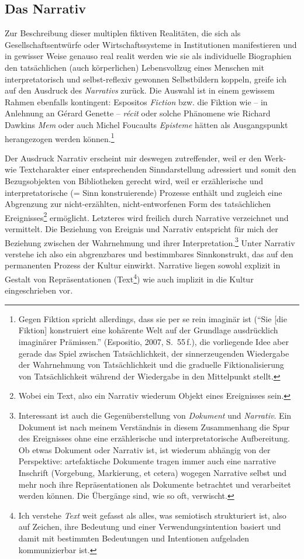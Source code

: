 \documentclass[output=paper]{langscibook}
\begin{document}
\hypertarget{das-narrativ}{%
\subsection*{Das Narrativ}\label{das-narrativ}}

Zur Beschreibung dieser multiplen fiktiven Realitäten, die sich als
Gesellschaftsentwürfe oder Wirtschaftssysteme in Institutionen
manifestieren und in gewisser Weise genauso real realit werden wie sie
als individuelle Biographien den tatsächlichen (auch körperlichen)
Lebensvollzug eines Menschen mit interpretatorisch und selbst-reflexiv
gewonnen Selbstbildern koppeln, greife ich auf den Ausdruck des
\emph{Narrativs} zurück. Die Auswahl ist in einem gewissem Rahmen
ebenfalls kontingent: Espositos \emph{Fiction} bzw. die Fiktion wie --
in Anlehnung an Gérard Genette -- \emph{récit} oder solche Phänomene wie
Richard Dawkins \emph{Mem} oder auch Michel Foucaults \emph{Episteme}
hätten als Ausgangspunkt herangezogen werden können.\footnote{Gegen
  Fiktion spricht allerdings, dass sie per se rein imaginär ist
  (\enquote{Sie {[}die Fiktion{]} konstruiert eine kohärente Welt auf
  der Grundlage ausdrücklich imaginärer Prämissen.} (Espositio, 2007, S.~55\,f.), die vorliegende Idee aber gerade das Spiel zwischen
  Tatsächlichkeit, der sinnerzeugenden Wiedergabe der Wahrnehmung von
  Tatsächlichkeit und die graduelle Fiktionalisierung von
  Tatsächlichkeit während der Wiedergabe in den Mittelpunkt stellt.}

Der Ausdruck Narrativ erscheint mir deswegen zutreffender, weil er den
Werk- wie Textcharakter einer entsprechenden Sinndarstellung adressiert
und somit den Bezugsobjekten von Bibliotheken gerecht wird, weil er
erzählerische und interpretatorische (= Sinn konstruierende) Prozesse
enthält und zugleich eine Abgrenzung zur nicht-erzählten,
nicht-entworfenen Form des tatsächlichen Ereignisses\footnote{Wobei ein
  Text, also ein Narrativ wiederum Objekt eines Ereignisses sein.}
ermöglicht. Letzteres wird freilich durch Narrative verzeichnet und
vermittelt. Die Beziehung von Ereignis und Narrativ entspricht für mich
der Beziehung zwischen der Wahrnehmung und ihrer
Interpretation.\footnote{Interessant ist auch die Gegenüberstellung von
  \emph{Dokument} und \emph{Narrativ}. Ein Dokument ist nach meinem
  Verständnis in diesem Zusammenhang die Spur des Ereignisses ohne eine
  erzählerische und interpretatorische Aufbereitung. Ob etwas Dokument
  oder Narrativ ist, ist wiederum abhängig von der Perspektive:
  artefaktische Dokumente tragen immer auch eine narrative Inschrift
  (Vorgebung, Markierung, et cetera) wogegen Narrative selbst und mehr
  noch ihre Repräsentationen als Dokumente betrachtet und verarbeitet
  werden können. Die Übergänge sind, wie so oft, verwischt.} Unter
Narrativ verstehe ich also ein abgrenzbares und bestimmbares
Sinnkonstrukt, das auf den permanenten Prozess der Kultur einwirkt.
Narrative liegen sowohl explizit in Gestalt von Repräsentationen
(Text\footnote{Ich verstehe \emph{Text} weit gefasst als alles, was
  semiotisch strukturiert ist, also auf Zeichen, ihre Bedeutung und
  einer Verwendungsintention basiert und damit mit bestimmten
  Bedeutungen und Intentionen aufgeladen kommunizierbar ist.}) wie auch
implizit in die Kultur eingeschrieben vor.
\end{document}
